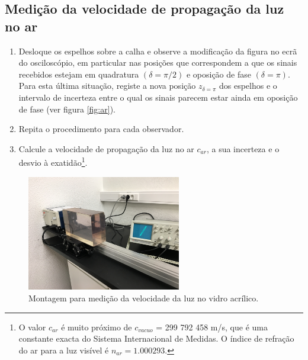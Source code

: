 \documentclass[a4paper,twoside,11pt]{report}      %
\begin{document}
\subsection{\sf Medição da velocidade de propagação da luz no ar}
\begin{enumerate}
\item Desloque os espelhos sobre a calha e observe a modificação da figura no ecrã do 
osciloscópio, em particular nas posições que correspondem a que os sinais recebidos estejam 
em quadratura $(\delta=\pi/2)$ e oposição de fase $(\delta=\pi)$. Para esta última situação, registe a 
nova posição $z_{\delta=\pi}$ dos espelhos e o intervalo de incerteza entre o qual os sinais parecem estar ainda em 
oposição de fase (ver figura \ref{fig:ar}).
\item Repita o procedimento para cada observador. 
\item Calcule a velocidade de propagação da luz no ar $c_{ar}$, a sua incerteza e o desvio à exatidão\footnote{O valor $c_{ar}$ é muito próximo de $c_{vacuo}$ = 299 792 458 m/s, que é uma constante exacta do Sistema Internacional de Medidas. O índice de refração do ar para a luz visível é $n_{ar}=1.000293$.}. 
\end{enumerate}

 \begin{figure}[h!tb]  
	\centering 
	\includegraphics[width=0.6\textwidth]{fig7}
	\caption{Montagem para medição da velocidade da luz no vidro acrílico. \label{fig:vidro}} 
\end{figure}
\end{document}
